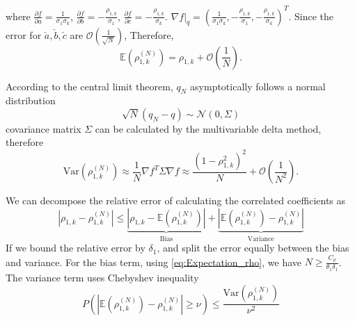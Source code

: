 where $\frac{\partial f}{\partial a} = \frac{1}{\sigma_1\sigma_k}$, $\frac{\partial f}{\partial b} = -\frac{\rho_{1,k}}{\sigma_1}$, $\frac{\partial f}{\partial c} = -\frac{\rho_{1,k}}{\sigma_k}$. $\nabla f|_{q} = (\frac{1}{\sigma_1\sigma_k},-\frac{\rho_{1,k}}{\sigma_1},-\frac{\rho_{1,k}}{\sigma_k} )^T$. Since the error for $\check{a},\check{b}, \check{c}$ are $\mathcal{O}(\frac{1}{\sqrt{N}})$, Therefore,
\begin{equation}
\label{eq:Expectation_rho}
    \mathbb{E}\left(\rho_{1,k}^{(N)}\right) = \rho_{1,k} + \mathcal{O}\left(\frac 1 N\right).
\end{equation}



According to the central limit theorem, $q_N$ asymptotically follows a normal distribution
\[
\sqrt{N}(q_N-q)\sim \mathcal{N}(0,\Sigma)
\]
covariance matrix $\Sigma$ can be calculated by the multivariable delta method, therefore
\begin{equation}
    \label{eq:Var_rho}
    \text{Var}\left(\rho_{1,k}^{(N)}\right)\approx \frac{1}{N}\nabla f^T \Sigma \nabla f\approx \frac{(1-\rho_{1,k}^2)^2}{N} + \mathcal{O}\left(\frac{1}{N^2}\right).
\end{equation}


We can decompose the relative error of calculating the correlated coefficients as 
\begin{equation*}
    \left|\rho_{1,k} - \rho_{1,k}^{(N)}\right|\le \underbrace{\left|\rho_{1,k} - \mathbb{E}\left(\rho_{1,k}^{(N)}\right)\right|}_{\text{Bias}}+\underbrace{\left|\mathbb{E}\left(\rho_{1,k}^{(N)}\right)-\rho_{1,k}^{(N)}\right|}_{\text{Variance}}
\end{equation*}
If we bound the relative error by $\delta_1$, and split the error equally between the bias and variance. For the bias term, using \eqref{eq:Expectation_rho}, we have $N\ge \frac{C_\rho}{\theta_1\delta_1}$. The variance term uses Chebyshev inequality
\[
P\left(\left|\mathbb{E}\left(\rho_{1,k}^{(N)}\right)-\rho_{1,k}^{(N)}\right|\ge \nu\right)\le \frac{\text{Var}\left(\rho_{1,k}^{(N)}\right)}{\nu^2}
\]


